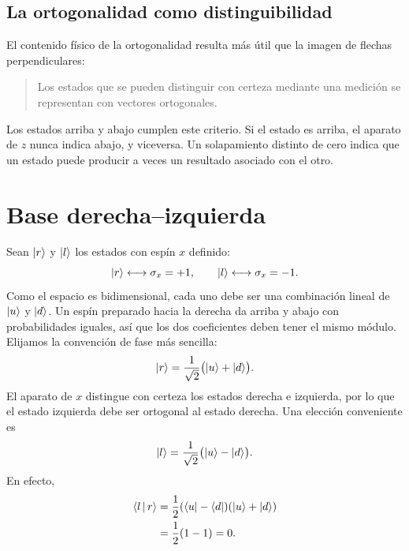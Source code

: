 \begin{classroomqa}
\end{classroomqa}

\subsection{La ortogonalidad como distinguibilidad}

El contenido físico de la ortogonalidad resulta más útil que la imagen de flechas perpendiculares:

\begin{quote}Los estados que se pueden distinguir con certeza mediante una medición se representan con vectores ortogonales.
\end{quote}

Los estados arriba y abajo cumplen este criterio. Si el estado es arriba, el aparato de \(z\) nunca indica abajo, y viceversa. Un solapamiento distinto de cero indica que un estado puede producir a veces un resultado asociado con el otro.

\section{Base derecha--izquierda}

Sean \(\left\lvert r\right\rangle\) y \(\left\lvert l\right\rangle\) los estados con espín \(x\) definido:
\[
\left\lvert r\right\rangle\longleftrightarrow\sigma_x=+1,\qquad
\left\lvert l\right\rangle\longleftrightarrow\sigma_x=-1.
\]
Como el espacio es bidimensional, cada uno debe ser una combinación lineal de \(\left\lvert u\right\rangle\) y \(\left\lvert d\right\rangle\). Un espín preparado hacia la derecha da arriba y abajo con probabilidades iguales, así que los dos coeficientes deben tener el mismo módulo. Elijamos la convención de fase más sencilla:
\begin{equation}
\left\lvert r\right\rangle=\frac{1}{\sqrt2}\bigl(\left\lvert u\right\rangle+\left\lvert d\right\rangle\bigr).
\label{eq:right-state}
\end{equation}
El aparato de \(x\) distingue con certeza los estados derecha e izquierda, por lo que el estado izquierda debe ser ortogonal al estado derecha. Una elección conveniente es
\begin{equation}
\left\lvert l\right\rangle=\frac{1}{\sqrt2}\bigl(\left\lvert u\right\rangle-\left\lvert d\right\rangle\bigr).
\label{eq:left-state}
\end{equation}
En efecto,
\begin{align}
\left\langle l\,\middle|\,r\right\rangle
&=\frac12(\left\langle u\right\rvert-\left\langle d\right\rvert)(\left\lvert u\right\rangle+\left\lvert d\right\rangle)\\
&=\frac12(1-1)=0.
\end{align}

